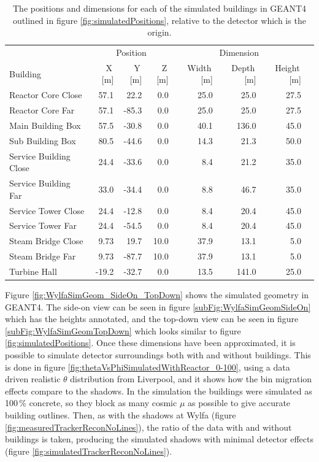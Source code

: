 \begin{table}[!h]
\centering
\begin{tabular}{lrrrrrrr}  
\toprule
\multicolumn{1}{c}{} & \multicolumn{3}{c}{Position} & \multicolumn{3}{c}{Dimension} \\
\cmidrule(r){2-4}
\cmidrule(r){5-7}
Building               & X\,[m] & Y\,[m] & Z\,[m] & Width\,[m] & Depth\,[m] & Height\,[m]\\
\midrule
Reactor Core Close     & 57.1   &  22.2  & 0.0     & 25.0       & 25.0       & 27.5\\
Reactor Core Far       & 57.1   & -85.3  & 0.0     & 25.0       & 25.0       & 27.5\\
Main Building Box      & 57.5   & -30.8  & 0.0     & 40.1       & 136.0      & 45.0\\
Sub Building Box       & 80.5   & -44.6  & 0.0     & 14.3       & 21.3       & 50.0\\
Service Building Close & 24.4   & -33.6  & 0.0     & 8.4        & 21.2       & 35.0\\
Service Building Far   & 33.0   & -34.4  & 0.0     & 8.8        & 46.7       & 35.0\\
Service Tower Close    & 24.4   & -12.8  & 0.0     & 8.4        & 20.4       & 45.0\\
Service Tower Far      & 24.4   & -54.5  & 0.0     & 8.4        & 20.4       & 45.0\\
Steam Bridge Close     & 9.73   &  19.7  & 10.0    & 37.9       & 13.1       & 5.0\\
Steam Bridge Far       & 9.73   & -87.7  & 10.0    & 37.9       & 13.1       & 5.0\\
Turbine Hall           & -19.2  & -32.7  & 0.0     & 13.5       & 141.0      & 25.0\\
\bottomrule  
\end{tabular}
\caption{The positions and dimensions for each of the simulated buildings in GEANT4 outlined in figure \ref{fig:simulatedPositions}, relative to the detector which is the origin.}
\label{tab:simulatedBuildingPositions}
\end{table}

Figure \ref{fig:WylfaSimGeom_SideOn_TopDown} shows the simulated geometry in  GEANT4. The side-on view can be seen in figure \ref{subFig:WylfaSimGeomSideOn} which has the heights annotated, and the top-down view can be seen in figure \ref{subFig:WylfaSimGeomTopDown} which looks similar to figure \ref{fig:simulatedPositions}. Once these dimensions have been approximated, it is possible to simulate detector surroundings both with and without buildings. This is done in figure \ref{fig:thetaVsPhiSimulatedWithReactor_0-100}, using a data driven realistic $\theta$ distribution from Liverpool, and it shows how the bin migration effects compare to the shadows. In the simulation the buildings were simulated as 100\,\% concrete, so they block as many cosmic $\mu$ as possible to give accurate building outlines. Then, as with the shadows at Wylfa (figure \ref{fig:measuredTrackerReconNoLines}), the ratio of the data with and without buildings is taken, producing the simulated shadows with minimal detector effects (figure \ref{fig:simulatedTrackerReconNoLines}). 

